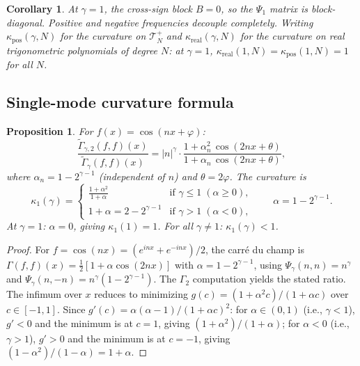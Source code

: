 \documentclass[11pt,a4paper]{article}
\theoremstyle{plain}
\newtheorem{proposition}[theorem]{Proposition}
\newtheorem{corollary}[theorem]{Corollary}
\theoremstyle{definition}
\theoremstyle{remark}
\begin{document}
\begin{corollary}\label{cor:block-diag}
At $\gamma = 1$, the cross-sign block $B = 0$, so the $\Psi_1$
matrix is block-diagonal. Positive and negative frequencies
decouple completely.
Writing $\kappa_{\mathrm{pos}}(\gamma,N)$ for the curvature
on $\mathcal{T}_N^+$ and $\kappa_{\mathrm{real}}(\gamma,N)$
for the curvature on real trigonometric polynomials of degree $N$:
at $\gamma = 1$, $\kappa_{\mathrm{real}}(1,N)
= \kappa_{\mathrm{pos}}(1,N) = 1$ for all $N$.
\end{corollary}


\subsection{Single-mode curvature formula}

\begin{proposition}\label{prop:single-mode}
For $f(x) = \cos(nx + \varphi)$:
\begin{equation}\label{eq:single-mode}
  \frac{\widetilde{\Gamma}_{\gamma,2}(f,f)(x)}
       {\widetilde{\Gamma}_\gamma(f,f)(x)}
  = |n|^\gamma \cdot
  \frac{1 + \alpha_n^2\,\cos(2nx+\theta)}
       {1 + \alpha_n\,\cos(2nx+\theta)},
\end{equation}
where $\alpha_n = 1 - 2^{\gamma-1}$ (independent of $n$)
and $\theta = 2\varphi$. The curvature is
\begin{equation}\label{eq:kappa1}
  \kappa_1(\gamma) =
  \begin{cases}
    \displaystyle\frac{1 + \alpha^2}{1 + \alpha}
    & \text{if } \gamma \leq 1 \;(\alpha \geq 0), \\[6pt]
    1 + \alpha = 2 - 2^{\gamma-1}
    & \text{if } \gamma > 1 \;(\alpha < 0),
  \end{cases}
  \qquad \alpha = 1 - 2^{\gamma-1}.
\end{equation}
At $\gamma = 1$: $\alpha = 0$, giving $\kappa_1(1) = 1$.
For all $\gamma \neq 1$: $\kappa_1(\gamma) < 1$.
\end{proposition}

\begin{proof}
For $f = \cos(nx) = (e^{inx} + e^{-inx})/2$, the carr\'e du champ is
$\Gamma(f,f)(x) = \tfrac{1}{2}[1 + \alpha\cos(2nx)]$
with $\alpha = 1 - 2^{\gamma-1}$,
using $\Psi_\gamma(n,n) = n^\gamma$ and
$\Psi_\gamma(n,-n) = n^\gamma(1 - 2^{\gamma-1})$.
The $\Gamma_2$ computation yields the stated ratio.
The infimum over $x$ reduces to minimizing
$g(c) = (1 + \alpha^2 c)/(1 + \alpha c)$ over $c \in [-1,1]$.
Since $g'(c) = \alpha(\alpha - 1)/(1+\alpha c)^2$:
for $\alpha \in (0,1)$ (i.e., $\gamma < 1$), $g' < 0$ and the
minimum is at $c = 1$, giving $(1+\alpha^2)/(1+\alpha)$;
for $\alpha < 0$ (i.e., $\gamma > 1$), $g' > 0$ and the
minimum is at $c = -1$, giving $(1-\alpha^2)/(1-\alpha) = 1+\alpha$.
\end{proof}
\end{document}

